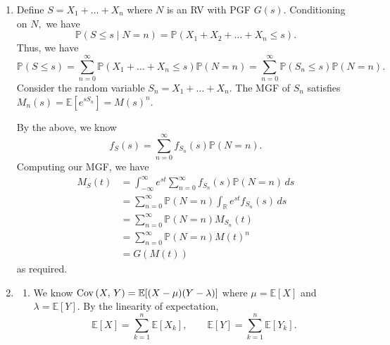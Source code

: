 \documentclass[12pt]{article}
\begin{document}
\begin{enumerate}
    To find the $k$-th moment, we can write $$
    e^{bs} - e^{as} = \sum_{j = 1}^{\infty} \dfrac{b^j - a^j}{j!} s^j,
    $$
    yielding
    $$
    M(s) = \dfrac{1}{b-a} \sum_{j = 0}^{\infty} \dfrac{b^{j + 1}
    -a^{j + 1}}{(j + 1)!}s^{j}.
    $$
    This yields $k$-th derivative
    \begin{align*}
      M^{(k)}(s) &= \dfrac{1}{b-a} \sum_{j = k}^{\infty} \dfrac{b^{j
      + 1} - a^{j + 1}}{(j+1)!} \dfrac{j!}{(j - k)!} s^{j - k} \\
      &= \dfrac{1}{b-a} \sum_{j = 0}^{\infty} \dfrac{b^{j +k +  1} -
      a^{j +k +  1}}{(j+k  + 1)(j)!} s^{j},
    \end{align*}
    meaning $M^{(k)}(0)$ satisfies
    $$
    M^{(k)}(0) =  \dfrac{b^{k+1} - a^{k+1}}{(b-a)(k + 1)} = \mathbb E[X^k]
    $$
    as required.

  \item Define $S = X_1 + \ldots + X_n$ where $N$ is an RV with PGF
    $G(s).$ Conditioning on $N,$ we have
    $$
    \mathbb P(S \leq s \mid N  = n) = \mathbb P(X_1 + X_2 + \ldots +
    X_n \leq s).
    $$
    Thus, we have $$
    \mathbb P(S \leq s) = \sum_{n = 0}^{\infty} \mathbb P(X_1 +
    \ldots + X_n \leq s) \mathbb P(N = n) = \sum_{n = 0}^{\infty}
    \mathbb P(S_n \leq s) \mathbb P(N = n).
    $$
    Consider the random variable $S_n = X_1 + \ldots + X_n.$ The MGF
    of $S_n$ satisfies $M_n(s) = \mathbb E[e^{sS_n}] = M(s)^{n}.$

    By the above, we know
    $$
    f_S(s) = \sum_{n = 0}^{\infty} f_{S_n}(s) \mathbb P(N = n).
    $$
    Computing our MGF, we have
    \begin{align*}
      M_S(t) &= \int_{-\infty}^{\infty} e^{st} \sum_{n = 0}^{\infty}
      f_{S_n}(s) \mathbb P(N = n) \, ds \\
      &= \sum_{n = 0}^{\infty} \mathbb P(N = n)\int_{\mathbb R}
      e^{st} f_{S_n}(s) \, ds \\
      &= \sum_{n = 0}^{\infty} \mathbb P(N = n) M_{S_n}(t) \\
      &= \sum_{n = 0}^{\infty} \mathbb P(N = n) M(t)^n \\
      &= G(M(t))
    \end{align*}
    as required.

  \item
    \begin{enumerate}
      \item  We know $\operatorname{Cov}\left(X,\,Y\right) = \mathbb E[(X - \mu)(Y - \lambda)]$
        where $\mu = \mathbb E[X]$ and $\lambda = \mathbb E[Y].$ By
        the linearity of expectation,
        $$
        \mathbb E[X] = \sum_{k = 1}^{n} \mathbb E[X_k], \qquad
        \mathbb E[Y] = \sum_{k = 1}^{n} \mathbb E[Y_k].
        $$


\end{enumerate}
\end{enumerate}
\end{document}
